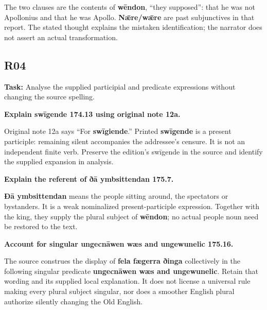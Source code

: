 The two clauses are the contents of \textbf{wēndon}, “they supposed”: that he was not Apollonius and that he was Apollo. \textbf{Nǣre/\allowbreak{}wǣre} are past subjunctives in that report. The stated thought explains the mistaken identification; the narrator does not assert an actual transformation.

\subsection*{R04}

\textbf{Task:} Analyse the supplied participial and predicate expressions without changing the source spelling.

\textbf{Explain swīgende 174.13 using original note 12a.}

Original note 12a says “For \textbf{swīgiende}.” Printed \textbf{swīgende} is a present participle: remaining silent accompanies the addressee's censure. It is not an independent finite verb. Preserve the edition's swīgende in the source and identify the supplied expansion in analysis.

\textbf{Explain the referent of ðā ymbsittendan 175.7.}

\textbf{Ðā ymbsittendan} means the people sitting around, the spectators or bystanders. It is a weak nominalized present-participle expression. Together with the king, they supply the plural subject of \textbf{wēndon}; no actual people noun need be restored to the text.

\textbf{Account for singular ungecnāwen wæs and ungewunelic 175.16.}

The source construes the display of \textbf{fela fægerra ðinga} collectively in the following singular predicate \textbf{ungecnāwen wæs and ungewunelic}. Retain that wording and its supplied local explanation. It does not license a universal rule making every plural subject singular, nor does a smoother English plural authorize silently changing the Old English.

